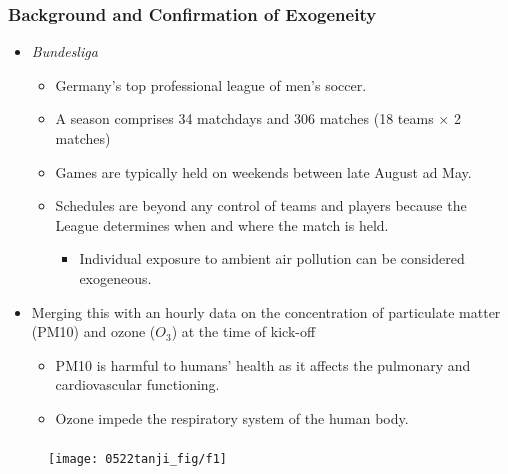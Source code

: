 \documentclass[dvipdfmx,11pt]{beamer}
\begin{document}
\begin{frame}\frametitle{Background and Confirmation of Exogeneity}
  \begin{itemize}
    \item \textit{Bundesliga}
    \begin{itemize}
      \item Germany's top professional league of men's soccer.
      \item A season comprises 34 matchdays and 306 matches (18 teams $\times$ 2 matches)
      \item Games are typically held on weekends between late August ad May.
      \item Schedules are beyond any control of teams and players because the League determines when and where the match is held.
      \begin{itemize}
        \item Individual exposure to ambient air pollution can be considered exogeneous.
      \end{itemize}
    \end{itemize}
    \item Merging this with an hourly data on the concentration of particulate matter (PM10) and ozone ($O_3$) at the time of kick-off
    \begin{itemize}
      \item PM10 is harmful to humans' health as it affects the pulmonary and cardiovascular functioning.
      \item Ozone impede the respiratory system of the human body.
    \end{itemize}
  \end{itemize}
\end{frame}

\begin{frame}\frametitle{}
  \begin{figure}
    \centering
    \texttt{[image: 0522tanji\_fig/f1]}
    \label{f1}
  \end{figure}
\end{frame}
\end{document}
